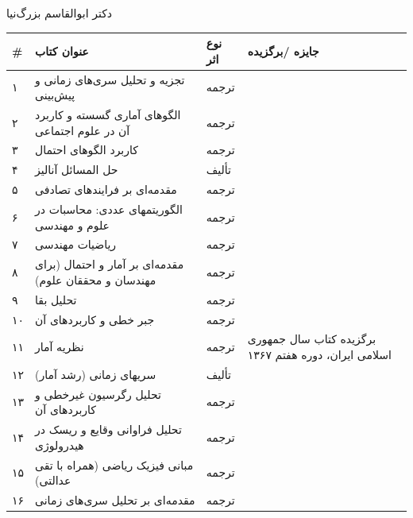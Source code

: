 \documentclass[
  letterpaper,
  DIV=11,
  numbers=noendperiod]{scrreprt}
\newcounter{none} %
\begin{document}
دکتر ابوالقاسم بزرگ‌نیا

{\def\LTcaptype{none} %
\begin{longtable}[]{@{}
  >{\raggedright\arraybackslash}p{}
  >{\raggedright\arraybackslash}p{}
  >{\raggedright\arraybackslash}p{}
  >{\raggedright\arraybackslash}p{}@{}}
\toprule\noalign{}
\begin{minipage}[b]{\linewidth}\raggedright
\#
\end{minipage} & \begin{minipage}[b]{\linewidth}\raggedright
عنوان کتاب
\end{minipage} & \begin{minipage}[b]{\linewidth}\raggedright
نوع اثر
\end{minipage} & \begin{minipage}[b]{\linewidth}\raggedright
جایزه /برگزیده
\end{minipage} \\
\midrule\noalign{}
\endhead
\bottomrule\noalign{}
\endlastfoot
۱ & تجزیه و تحلیل سری‌های زمانی و پیش‌بینی & ترجمه & \\
۲ & الگوهای آماری گسسته و کاربرد آن در علوم اجتماعی & ترجمه & \\
۳ & کاربرد الگوهای احتمال & ترجمه & \\
۴ & حل المسائل آنالیز & تألیف & \\
۵ & مقدمه‌ای بر فرایندهای تصادفی & ترجمه & \\
۶ & الگوریتمهای عددی: محاسبات در علوم و مهندسی & ترجمه & \\
۷ & ریاضیات مهندسی & ترجمه & \\
۸ & مقدمه‌ای بر آمار و احتمال (برای مهندسان و محققان علوم) & ترجمه & \\
۹ & تحلیل بقا & ترجمه & \\
۱۰ & جبر خطی و کاربردهای آن & ترجمه & \\
۱۱ & نظریه آمار & ترجمه & برگزیده کتاب سال جمهوری اسلامی ایران، دوره
هفتم ۱۳۶۷ \\
۱۲ & سریهای زمانی (رشد آمار) & تألیف & \\
۱۳ & تحلیل رگرسیون غیرخطی و کاربردهای آن & ترجمه & \\
۱۴ & تحلیل فراوانی وقایع و ریسک در هیدرولوژی & ترجمه & \\
۱۵ & مبانی فیزیک ریاضی (همراه با تقی عدالتی) & ترجمه & \\
۱۶ & مقدمه‌ای بر تحلیل سری‌های زمانی & ترجمه & \\
\end{longtable}
}
\end{document}

